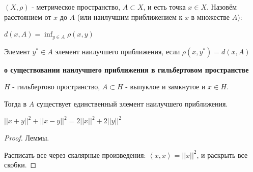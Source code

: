 \begin{definition}
    $(X, \rho)$ - метрическое пространство, $A \subset X$, и есть точка $x \in X$. Назовём расстоянием от $x$ до $A$ (или наилучшим приближением к $x$ в множестве $A$):
    
    $d(x, A) = \inf_{y \in A} \rho (x, y)$ 
\end{definition}

\begin{definition}
    Элемент $y^{*} \in A$ элемент наилучшего приближения, если $\rho (x, y^*) = d(x, A)$
\end{definition}

\begin{theorem}
    \textbf{о существовании наилучшего приближения в гильбертовом пространстве}

    $H$ - гильбертово пространство, $A \subset H$ - выпуклое и замкнутое и $x \in H$.

    Тогда в $A$ существует единственный элемент наилучшего приближения.
\end{theorem}

\begin{lemma}
    $||x + y||^2 + ||x - y||^2 = 2||x||^2 + 2||y||^2 $
\end{lemma}

\begin{proof} Леммы.
    

    Расписать все через скалярные произведения: $\left< x, x \right> = || x ||^2$, и раскрыть все скобки.
\end{proof}

